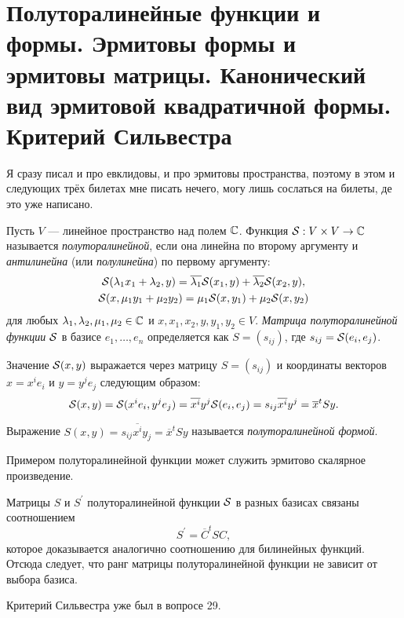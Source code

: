 \section{Полуторалинейные функции и формы. Эрмитовы формы и эрмитовы матрицы.
Канонический вид эрмитовой квадратичной формы. Критерий Сильвестра}

Я сразу писал и про евклидовы, и про эрмитовы пространства, поэтому в этом и следующих трёх билетах мне писать нечего, могу лишь сослаться на билеты, де это уже написано.

\begin{definition}
    Пусть $V$ --- линейное пространство над полем $\C$. Функция $\S: V \times V \to \C$ называется \textit{полуторалинейной}, если она линейна по второму аргументу и \textit{антилинейна} (или \textit{полулинейна}) по первому аргументу:
    \begin{gather*}
        \S(\lambda_1x_1 + \lambda_2, y) = \overline{\lambda_1}\S(x_1, y) + \overline{\lambda_2}\S(x_2, y),\\
        \S(x, \mu_1y_1 + \mu_2y_2) = \mu_1\S(x, y_1) + \mu_2\S(x, y_2)
    \end{gather*}
    для любых $\lambda_1, \lambda_2, \mu_1, \mu_2 \in \C$ и $x, x_1, x_2, y, y_1, y_2 \in V$. \textit{Матрица полуторалинейной функции $\S$} в базисе $e_1, \ldots, e_n$ определяется как $S = (s_{ij})$, где $s_{ij} = \S(e_i, e_j)$.
\end{definition}

Значение $\S(x, y)$ выражается через матрицу $S = (s_{ij})$ и координаты векторов $x = x^ie_i$ и $y = y^je_j$ следующим образом:
\[
    \S(x, y) = \S(x^ie_i, y^je_j) = \overline{x^i}y^j\S(e_i, e_j) = s_{ij}\overline{x^i}y^j = \overline{x}^tSy.
\]

\begin{definition}
    Выражение $S(x, y) = s_{ij}\overline{x^i}y_j = \overline{x}^tSy$ называется \textit{полуторалинейной формой}.
\end{definition}

Примером полуторалинейной функции может служить эрмитово скалярное произведение.

Матрицы $S$ и $S^\prime$ полуторалинейной функции $\S$ в разных базисах связаны соотношением
\[
    S^\prime = \overline{C}^tSC,
\]
которое доказывается аналогично соотношению для билинейных функций. Отсюда следует, что ранг матрицы полуторалинейной функции не зависит от выбора базиса.

Критерий Сильвестра уже был в вопросе 29.

